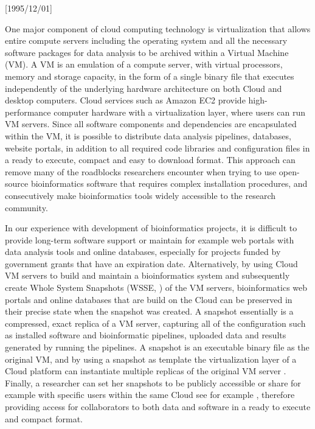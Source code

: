 \NeedsTeXFormat{LaTeX2e}[1995/12/01] \documentclass[10pt]{bmc_article}
\newenvironment{bmcformat}{\begin{raggedright}\baselineskip20pt\sloppy\setboolean{publ}{false}}{\end{raggedright}\baselineskip20pt\sloppy}
\begin{document}
\begin{bmcformat}
One major component of cloud computing technology is virtualization \cite{Uhling2005} that allows entire 
compute servers including the operating system and all the necessary software packages for data analysis 
to be archived within a Virtual Machine (VM). A VM is an emulation of a compute server, with virtual 
processors, memory and storage capacity, in the form of a single binary file that executes 
independently of the underlying hardware architecture on both Cloud and desktop computers. 
Cloud services such as Amazon EC2 \cite{awsec2} provide high- performance computer hardware with a 
virtualization layer, where users can run VM servers. Since all software components and dependencies are 
encapsulated  within the VM, it is possible to  distribute data analysis pipelines, databases, website portals, 
in addition to all required code libraries and configuration files in a ready to execute, compact and easy to 
download format.  This approach can remove many of the roadblocks researchers encounter when trying 
to use open-source bioinformatics software that requires complex installation procedures, and consecutively 
make bioinformatics tools widely accessible to the research community. 

In our experience with development of bioinformatics projects, it is difficult to provide long-term software
support or maintain for example web portals with data analysis tools and online databases, especially 
for projects funded by government grants that have an expiration date. Alternatively, by using Cloud VM servers
to build and maintain a bioinformatics system and subsequently create Whole System Snapshots (WSSE,
\cite{Dudley2010, Krampis2012}) of the VM servers, bioinformatics web portals and online databases that 
are build on the Cloud can be  preserved in their precise state when the snapshot was created. A snapshot 
essentially is a compressed,  exact replica of a VM server, capturing all of the configuration such as installed 
software and bioinformatic pipelines, uploaded data and  results generated by running the pipelines. 
A snapshot is an executable binary file as the original VM, and by using a snapshot as template the 
virtualization layer of a Cloud platform can instantiate multiple replicas of the original VM server \cite{ebs}. 
Finally, a researcher can set her snapshots to be publicly  accessible or share for example with specific users 
 within the same Cloud see for example \cite{ebs},  therefore providing access for collaborators to both  
data and software in a ready to execute and compact format. 


\end{bmcformat}
\end{document}
